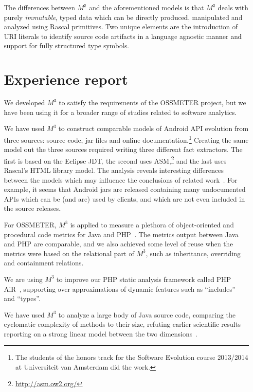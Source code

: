 \documentclass[conference]{IEEEtran}
\newcommand{\mthree}{\ensuremath{M^3}\xspace}
\begin{document}
The differences between \mthree and the aforementioned models is that \mthree
deals with purely \emph{immutable}, typed data which can be directly
produced, manipulated and analyzed using Rascal primitives. Two unique
elements are the introduction of URI literals to identify source code
artifacts in a language agnostic manner and support for fully structured type
symbols.

\section{Experience report}

We developed \mthree to satisfy the requirements of the OSSMETER project, but
we have been using it for a broader range of studies related to software
analytics.

We have used \mthree to construct comparable models of Android API evolution
from three sources: source code, jar files and online
documentation.\!\footnote{The students of the honors track for the Software
Evolution course 2013/2014 at Universiteit van Amsterdam did the work.}
Creating the same model out the three sources required writing three different
fact extractors. The first is based on the Eclipse JDT, the second uses
ASM,\!\footnote{\url{http://asm.ow2.org/}} and the last uses Rascal's HTML
library model. The analysis reveals interesting differences between the models
which may influence the conclusions of related work~\cite{apianalysis}. For
example, it seems that Android jars are released containing many undocumented
APIs which can be (and are) used by clients, and which are not even included
in the source releases.

For OSSMETER, \mthree is applied to measure a plethora of object-oriented and
procedural code metrics for Java and PHP~\cite{mood,ck}. The metrics output
between Java and PHP are comparable, and we also achieved some level of reuse
when the metrics were based on the relational part of \mthree, such as
inheritance, overriding and containment relations.

We are using \mthree to improve our PHP static analysis framework called PHP
AiR~\cite{phpair}, supporting over-approximations of dynamic features such as
``includes''~\cite{ase2014} and ``types''.

We have used \mthree to analyze a large body of Java source code, comparing
the cyclomatic complexity of methods to their size, refuting earlier
scientific results reporting on a strong linear model between the two
dimensions~\cite{davy}.
\end{document}
